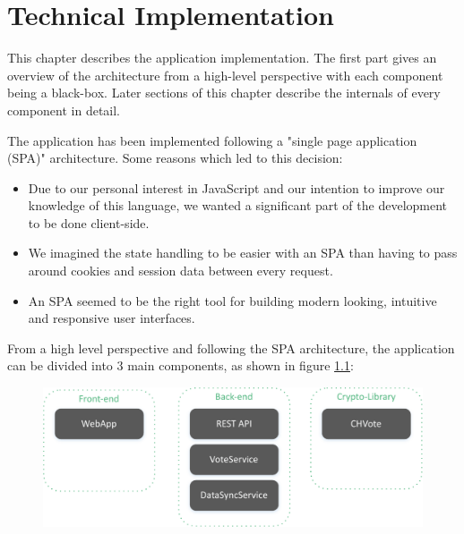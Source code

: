 \chapter{Technical Implementation}
This chapter describes the application implementation. The first part gives an overview of the architecture from a high-level perspective with each component being a black-box. Later sections of this chapter describe the internals of every component in detail.

The application has been implemented following a "{}single page application (SPA)"{} architecture. Some reasons which led to this decision:
\begin{itemize}
	\item Due to our personal interest in JavaScript and our intention to improve our knowledge of this language, we wanted a significant part of the development to be done client-side.
	\item We imagined the state handling to be easier with an SPA than having to pass around cookies and session data between every request.
	\item An SPA seemed to be the right tool for building modern looking, intuitive and responsive user interfaces.
\end{itemize}

From a high level perspective and following the SPA architecture, the application can be divided into 3 main components, as shown in figure \ref{System components}:

\begin{figure}[h!]
\begin{center}
\includegraphics[scale=0.95]{assets/componentdiagram.pdf}
\label{System components}
\end{center}
\end{figure}


